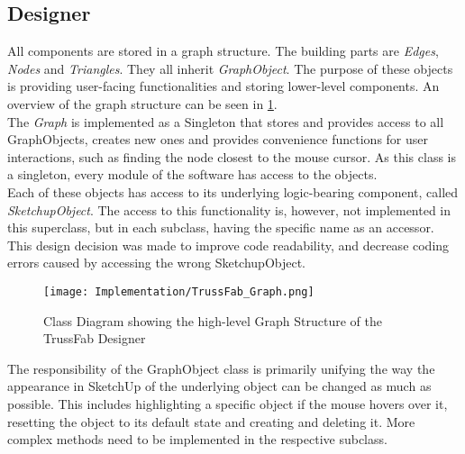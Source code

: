 \subsection{Designer}
All components are stored in a graph structure. The building parts are \textit{Edges}, \textit{Nodes} and \textit{Triangles}. They all inherit \textit{GraphObject}. The purpose of these objects is providing user-facing functionalities and storing lower-level components. An overview of the graph structure can be seen in \ref{fig:graph}.\\
The \textit{Graph} is implemented as a Singleton  that stores and provides access to all GraphObjects, creates new ones and provides convenience functions for user interactions, such as finding the node closest to the mouse cursor. As this class is a singleton, every module of the software has access to the objects.\\
Each of these objects has access to its underlying logic-bearing component, called \textit{SketchupObject}. The access to this functionality is, however, not implemented in this superclass, but in each subclass, having the specific name as an accessor. This design decision was made to improve code readability, and decrease coding errors caused by accessing the wrong SketchupObject.\\
\begin{figure}
    \texttt{[image: Implementation/TrussFab\_Graph.png]}
    \centering
    \caption{Class Diagram showing the high-level Graph Structure of the TrussFab Designer}
    \label{fig:graph}
\end{figure}
The responsibility of the GraphObject class is primarily unifying the way the appearance in SketchUp of the underlying object can be changed as much as possible. This includes highlighting a specific object if the mouse hovers over it, resetting the object to its default state and creating and deleting it. More complex methods need to be implemented in the respective subclass.\\
